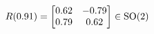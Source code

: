 \documentclass[preview]{standalone}
\begin{document}
\begin{align*}
\special{dvisvgm:raw <g id='unique000'>}R(0.91) = \begin{bmatrix} 0.62 & -0.79 \\ 0.79 & 0.62 \end{bmatrix} \in \text{SO}(2)\special{dvisvgm:raw </g>}
\end{align*}
\end{document}
